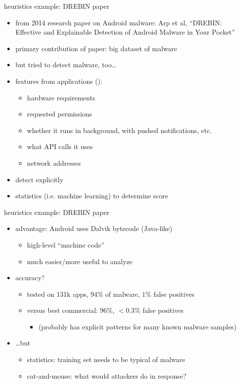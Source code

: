 
\begin{frame}{heuristics example: DREBIN paper}
    \begin{itemize}
    \item {\small from 2014 research paper on Android malware: Arp et al, ``DREBIN: Effective and Explainable Detection of Android Malware in Your Pocket''}
    \item primary contribution of paper: big dataset of malware
    \item but tried to detect malware, too\ldots
    \item features from applications ():
        \begin{itemize}
        \item hardware requirements
        \item requested permissions
        \item whether it runs in background, with pushed notifications, etc.
        \item what API calls it uses
        \item network addresses
        \end{itemize}
    \item detect  explicitly
    \item statistics (i.e. machine learning) to determine score
    \end{itemize}
\end{frame}

\begin{frame}{heuristics example: DREBIN paper}
    \begin{itemize}
    \item advantage: Android uses Dalvik bytecode (Java-like)
        \begin{itemize}
        \item high-level ``machine code''
        \item much easier/more useful to analyze
        \end{itemize}
    \item accuracy?
        \begin{itemize}
        \item tested on 131k apps, $94$\% of malware, $1$\% false positives
        \item versus best commercial: $96$\%, $<0.3$\% false positives
            \begin{itemize}
            \item (probably has explicit patterns for many known malware samples)
            \end{itemize}
        \end{itemize}
    \item \ldots but
        \begin{itemize}
        \item statistics: training set needs to be typical of malware
        \item cat-and-mouse: what would attackers do in response?
        \end{itemize}
    \end{itemize}
\end{frame}
